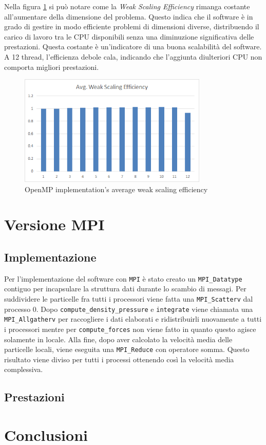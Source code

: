 \documentclass[a4paper, 12pt]{report}
\begin{document}
\begin{sloppypar}
  \bigskip
  \noindent
  Nella figura \ref{fig:omp_wse} si può notare come la \textit{Weak Scaling Efficiency} rimanga costante 
  all'aumentare della dimensione del problema. Questo indica che il software è in grado di gestire in 
  modo efficiente problemi di dimensioni diverse, distribuendo il carico di lavoro tra le CPU disponibili 
  senza una diminuzione significativa delle prestazioni. Questa costante è un'indicatore
  di una buona scalabilità del software. A 12 thread, l'efficienza debole cala, indicando che l'aggiunta diulteriori CPU
  non comporta migliori prestazioni.



  \begin{figure}[ht]
    \centering
    \includegraphics[width=9cm]{img/omp-wse.png}
    \caption{OpenMP implementation's average weak scaling efficiency}
    \label{fig:omp_wse}
  \end{figure}
\end{sloppypar}

{\let\clearpage\relax\chapter*{Versione MPI}}
\section*{Implementazione}
Per l'implementazione del software con \texttt{MPI} è stato creato un \texttt{MPI\_Datatype} contiguo per incapsulare la struttura
dati durante lo scambio di messagi. Per suddividere le particelle fra tutti i processori viene fatta una \texttt{MPI\_Scatterv} dal processo 0.
Dopo \texttt{compute\_density\_pressure} e \texttt{integrate} viene chiamata una \texttt{MPI\_Allgatherv} per raccogliere i dati elaborati
e ridistribuirli nuovamente a tutti i processori mentre per \texttt{compute\_forces} non viene fatto in quanto questo agisce solamente in locale.
Alla fine, dopo aver calcolato la velocità media delle particelle locali, viene eseguita una \texttt{MPI\_Reduce} con operatore somma.
Questo risultato viene diviso per tutti i processi ottenendo così la velocità media complessiva.

\section*{Prestazioni}


\chapter*{Conclusioni}
\end{document}
